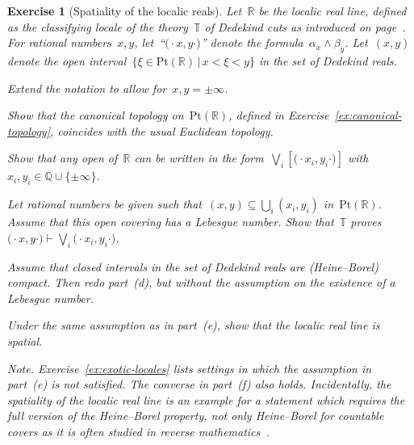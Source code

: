 \documentclass{ws-rv9x6}
\newtheorem{ex}{Exercise}
\newenvironment{exercise}[1]{
  \begin{ex}[#1]
}{\end{ex}}
\newcommand{\QQ}{\mathbb{Q}}
\newcommand{\RR}{\mathbb{R}}
\newcommand{\TT}{\mathbb{T}}
\renewcommand{\_}{\mathpunct{.}}
\newcommand{\?}{\,{:}\,}
\newcommand{\Pt}{\mathrm{Pt}}
\begin{document}
\begin{exercise}{Spatiality of the localic reals}%
\label{ex:spatiality-reals}%
\newcommand{\fa}{\ensuremath{(\!\cdot}}%
\newcommand{\fb}{\ensuremath{\cdot\!)}}%
Let~$\RR$ be the localic real line, defined as the classifying locale of the
theory~$\TT$ of Dedekind cuts as introduced on
page~\pageref{par:dedekind-cuts}. For rational numbers~$x,y$, let~``$\fa x,y
\fb$'' denote the formula~$\alpha_x \wedge \beta_y$. Let~$(x,y)$ denote the
open interval~$\{ \xi \in \Pt(\RR) \,|\, x < \xi < y \}$ in the set of Dedekind reals.
\begin{alphlist}[(f)]
\item Extend the notation to allow for~$x,y=\pm\infty$.
\item Show that the canonical topology on~$\Pt(\RR)$, defined in
Exercise~\ref{ex:canonical-topology}, coincides with the usual Euclidean
topology.
\item Show that any open of~$\RR$ can be written in the form~$\bigvee_i
[\fa x_i,y_i \fb]$ with~$x_i,y_i \in \QQ \cup \{\pm\infty\}$.
\item Let rational numbers be given such that~$(x,y) \subseteq \bigcup_i
(x_i,y_i)$ in~$\Pt(\RR)$. Assume that this open covering has a Lebesgue number.
Show that~$\TT$ proves~$\fa x,y \fb \vdash \bigvee_i \fa x_i,y_i \fb$.
\item Assume that closed intervals in the set of Dedekind reals are
(Heine--Borel) compact. Then redo part~(d), but without the assumption on the
existence of a Lebesgue number.
\item Under the same assumption as in part~(e), show that the localic real line
is spatial.
\end{alphlist}
{\scriptsize\emph{Note.} Exercise~\ref{ex:exotic-locales} lists settings in
which the assumption in part~(e) is not satisfied. The converse in part~(f)
also holds. Incidentally, the spatiality of the localic real line is an example
for a statement which requires the full version of the Heine--Borel property,
not only Heine--Borel for countable covers as it is often studied in reverse
mathematics~\cite{normann-sanders:uncountable}.\par}
\end{exercise}
\end{document}
